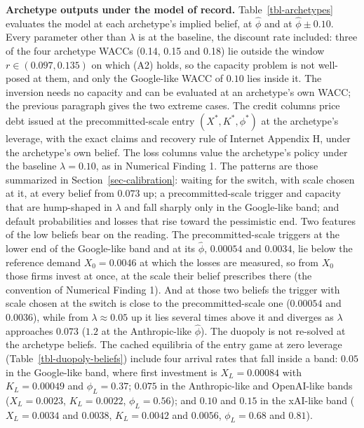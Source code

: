 \documentclass[
  11pt,
  letterpaper,
]{scrartcl}
\begin{document}
\textbf{Archetype outputs under the model of record.}
Table~\ref{tbl-archetypes} evaluates the model at each archetype's
implied belief, at \(\hat{\phi}\) and at \(\hat{\phi} \pm 0.10\). Every
parameter other than \(\lambda\) is at the baseline, the discount rate
included: three of the four archetype WACCs (0.14, 0.15 and 0.18) lie
outside the window \(r \in (0.097, 0.135)\) on which (A2) holds, so the
capacity problem is not well-posed at them, and only the Google-like
WACC of \(0.10\) lies inside it. The inversion needs no capacity and can
be evaluated at an archetype's own WACC; the previous paragraph gives
the two extreme cases. The credit columns price debt issued at the
precommitted-scale entry \((X^*, K^*, \phi^*)\) at the archetype's
leverage, with the exact claims and recovery rule of Internet Appendix
H, under the archetype's own belief. The loss columns value the
archetype's policy under the baseline \(\lambda = 0.10\), as in
Numerical Finding 1. The patterns are those summarized in
Section~\ref{sec-calibration}: waiting for the switch, with scale chosen
at it, at every belief from \(0.073\) up; a precommitted-scale trigger
and capacity that are hump-shaped in \(\lambda\) and fall sharply only
in the Google-like band; and default probabilities and losses that rise
toward the pessimistic end. Two features of the low beliefs bear on the
reading. The precommitted-scale triggers at the lower end of the
Google-like band and at its \(\hat{\phi}\), \(0.00054\) and \(0.0034\),
lie below the reference demand \(X_0 = 0.0046\) at which the losses are
measured, so from \(X_0\) those firms invest at once, at the scale their
belief prescribes there (the convention of Numerical Finding 1). And at
those two beliefs the trigger with scale chosen at the switch is close
to the precommitted-scale one (\(0.00054\) and \(0.0036\)), while from
\(\lambda \approx 0.05\) up it lies several times above it and diverges
as \(\lambda\) approaches \(0.073\) (\(1.2\) at the Anthropic-like
\(\hat{\phi}\)). The duopoly is not re-solved at the archetype beliefs.
The cached equilibria of the entry game at zero leverage
(Table~\ref{tbl-duopoly-beliefs}) include four arrival rates that fall
inside a band: \(0.05\) in the Google-like band, where first investment
is \(X_L = 0.00084\) with \(K_L = 0.00049\) and \(\phi_L = 0.37\);
\(0.075\) in the Anthropic-like and OpenAI-like bands (\(X_L = 0.0023\),
\(K_L = 0.0022\), \(\phi_L = 0.56\)); and \(0.10\) and \(0.15\) in the
xAI-like band (\(X_L = 0.0034\) and \(0.0038\), \(K_L = 0.0042\) and
\(0.0056\), \(\phi_L = 0.68\) and \(0.81\)).
\end{document}
